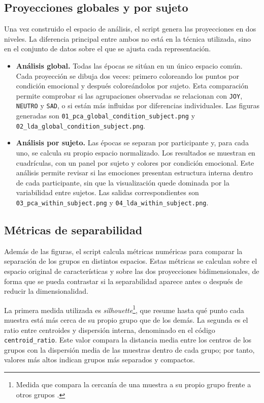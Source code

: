 \subsection{Proyecciones globales y por sujeto}

Una vez construido el espacio de análisis, el script genera las proyecciones en dos niveles. La diferencia principal entre ambos no está en la técnica utilizada, sino en el conjunto de datos sobre el que se ajusta cada representación.

\begin{itemize}
    \item \textbf{Análisis global.} Todas las épocas se sitúan en un único espacio común. Cada proyección se dibuja dos veces: primero coloreando los puntos por condición emocional y después coloreándolos por sujeto. Esta comparación permite comprobar si las agrupaciones observadas se relacionan con \texttt{JOY}, \texttt{NEUTRO} y \texttt{SAD}, o si están más influidas por diferencias individuales. Las figuras generadas son \texttt{01\_pca\_global\_condition\_subject.png} y \texttt{02\_lda\_global\_condition\_subject.png}.

    \item \textbf{Análisis por sujeto.} Las épocas se separan por participante y, para cada uno, se calcula su propio espacio normalizado. Los resultados se muestran en cuadrículas, con un panel por sujeto y colores por condición emocional. Este análisis permite revisar si las emociones presentan estructura interna dentro de cada participante, sin que la visualización quede dominada por la variabilidad entre sujetos. Las salidas correspondientes son \texttt{03\_pca\_within\_subject.png} y \texttt{04\_lda\_within\_subject.png}.
\end{itemize}

\subsection{Métricas de separabilidad}

Además de las figuras, el script calcula métricas numéricas para comparar la separación de los grupos en distintos espacios. Estas métricas se calculan sobre el espacio original de características y sobre las dos proyecciones bidimensionales, de forma que se pueda contrastar si la separabilidad aparece antes o después de reducir la dimensionalidad.

La primera medida utilizada es \textit{silhouette}\footnote{Medida que compara la cercanía de una muestra a su propio grupo frente a otros grupos \cite{wikipediaSilhouetteClustering}.}, que resume hasta qué punto cada muestra está más cerca de su propio grupo que de los demás. La segunda es el ratio entre centroides y dispersión interna, denominado en el código \texttt{centroid\_ratio}. Este valor compara la distancia media entre los centros de los grupos con la dispersión media de las muestras dentro de cada grupo; por tanto, valores más altos indican grupos más separados y compactos.

